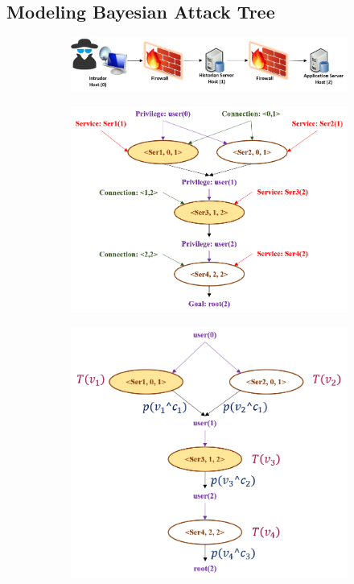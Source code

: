 \subsection{Modeling Bayesian Attack Tree}
\begin{figure}[htbp]
	\centering
	\begin{subfigure}{0.48\textwidth}
	\centering
	\includegraphics[width=\textwidth]{fig-example.png}
	\caption{}\label{sfig-example}
	\end{subfigure}
	\begin{subfigure}{0.25\textwidth}
	\centering
	\includegraphics[width=\textwidth]{fig-attacktree.png}
	\caption{}\label{sfig-attacktree}
	\end{subfigure}
	\begin{subfigure}{0.22\textwidth}
	\centering
	\includegraphics[width=\textwidth]{fig-simpleattacktree.png}

\end{subfigure}
\end{figure}
